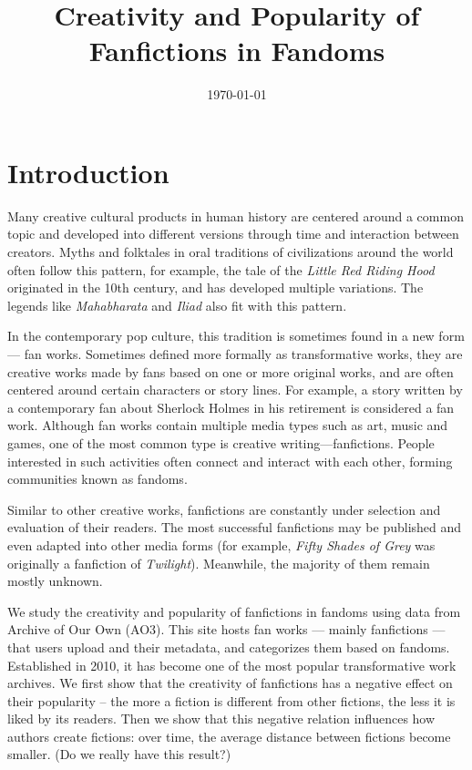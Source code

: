 \documentclass[11pt]{article} %
\begin{document}

\title{Creativity and Popularity of Fanfictions in Fandoms} %
\date{\today}
\maketitle %

\section{Introduction} %
\label{sec:introduction}
Many creative cultural products in human history are centered around a common topic and developed into different versions through time and interaction between creators. Myths and folktales in oral traditions of civilizations around the world often follow this pattern, for example, the tale of the \emph{Little Red Riding Hood} originated in the 10th century, and has developed multiple variations\cite{littlered}. The legends like \emph{Mahabharata} and \emph{Iliad} also fit with this pattern.

In the contemporary pop culture, this tradition is sometimes found in a new form --- fan works. Sometimes defined more formally as transformative works, they are creative works made by fans based on one or more original works, and are often centered around certain characters or story lines\cite{wiki:transf_work}. For example, a story written by a contemporary fan about Sherlock Holmes in his retirement is considered a fan work. Although fan works contain multiple media types such as art, music and games, one of the most common type is creative writing---fanfictions. People interested in such activities often connect and interact with each other, forming communities known as fandoms\cite{wiki:fandom}.

Similar to other creative works, fanfictions are constantly under selection and evaluation of their readers. The most successful fanfictions may be published and even adapted into other media forms (for example, \emph{Fifty Shades of Grey} was originally a fanfiction of \emph{Twilight}). Meanwhile, the majority of them remain mostly unknown.

We study the creativity and popularity of fanfictions in fandoms using data from Archive of Our Own (AO3). This site hosts fan works --- mainly fanfictions --- that users upload and their metadata, and categorizes them based on fandoms. Established in 2010, it has become one of the most popular transformative work archives. We first show that the creativity of fanfictions has a negative effect on their popularity -- the more a fiction is different from other fictions, the less it is liked by its readers. Then we show that this negative relation influences how authors create fictions: over time, the average distance between fictions become smaller. (Do we really have this result?)
\end{document}
